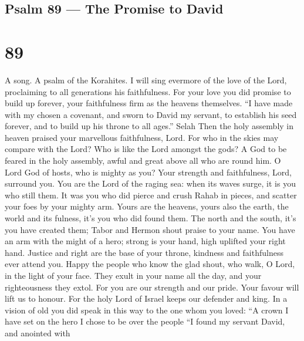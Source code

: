 \hypertarget{psalm-89-the-promise-to-david}{%
\subsection{Psalm 89 --- The Promise to
David}\label{psalm-89-the-promise-to-david}}

\hypertarget{section-88}{%
\section{89}\label{section-88}}

A song. A psalm of the Korahites.  I will sing evermore of
the love of the Lord, proclaiming to all generations his faithfulness.
 For your love you did promise to build up forever, your
faithfulness firm as the heavens themselves.  ``I have made
with my chosen a covenant, and sworn to David my servant, 
to establish his seed forever, and to build up his throne to all ages.''
Selah  Then the holy assembly in heaven praised your
marvellous faithfulness, Lord.  For who in the skies may
compare with the Lord? Who is like the Lord amongst the gods?
 A God to be feared in the holy assembly, awful and great
above all who are round him.  O Lord God of hosts, who is
mighty as you? Your strength and faithfulness, Lord, surround you.
 You are the Lord of the raging sea: when its waves surge,
it is you who still them.  It was you who did pierce and
crush Rahab in pieces, and scatter your foes by your mighty arm.
 Yours are the heavens, yours also the earth, the world and
its fulness, it's you who did found them.  The north and
the south, it's you have created them; Tabor and Hermon shout praise to
your name.  You have an arm with the might of a hero;
strong is your hand, high uplifted your right hand. 
Justice and right are the base of your throne, kindness and faithfulness
ever attend you.  Happy the people who know the glad shout,
who walk, O Lord, in the light of your face.  They exult in
your name all the day, and your righteousness they extol. 
For you are our strength and our pride. Your favour will lift us to
honour.  For the holy Lord of Israel keeps our defender and
king.  In a vision of old you did speak in this way to the
one whom you loved: ``A crown I have set on the hero I chose to be over
the people  ``I found my servant David, and anointed with
